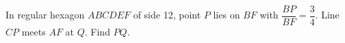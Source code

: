 In regular hexagon $ABCDEF$ of side 12, point $P$ lies on $BF$ with $\dfrac{B P}{B F} = \dfrac{3}{4}$. Line $CP$ meets $AF$ at $Q$. Find $PQ$.
